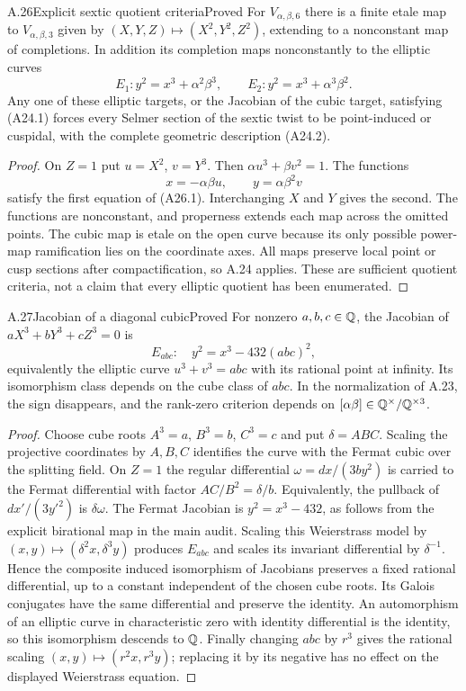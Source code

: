 \begin{statement}{A.26}{Explicit sextic quotient criteria}{Proved}
For $V_{\alpha,\beta,6}$ there is a finite etale map to $V_{\alpha,\beta,3}$ given by $(X,Y,Z)\mapsto(X^2,Y^2,Z^2)$, extending to a nonconstant map of completions. In addition its completion maps nonconstantly to the elliptic curves
\[
E_1:y^2=x^3+\alpha^2\beta^3,
\qquad E_2:y^2=x^3+\alpha^3\beta^2.
\tag{A26.1}
\]
Any one of these elliptic targets, or the Jacobian of the cubic target, satisfying (A24.1) forces every Selmer section of the sextic twist to be point-induced or cuspidal, with the complete geometric description (A24.2).
\end{statement}
\begin{proof}
On $Z=1$ put $u=X^2$, $v=Y^3$. Then $\alpha u^3+\beta v^2=1$. The functions
\[
x=-\alpha\beta u,\qquad y=\alpha\beta^2v
\]
satisfy the first equation of (A26.1). Interchanging $X$ and $Y$ gives the second. The functions are nonconstant, and properness extends each map across the omitted points. The cubic map is etale on the open curve because its only possible power-map ramification lies on the coordinate axes. All maps preserve local point or cusp sections after compactification, so A.24 applies. These are sufficient quotient criteria, not a claim that every elliptic quotient has been enumerated.
\end{proof}

\begin{statement}{A.27}{Jacobian of a diagonal cubic}{Proved}
For nonzero $a,b,c\in\mathbb Q$, the Jacobian of $aX^3+bY^3+cZ^3=0$ is
\[
E_{abc}:\quad y^2=x^3-432(abc)^2,
\]
equivalently the elliptic curve $u^3+v^3=abc$ with its rational point at infinity. Its isomorphism class depends on the cube class of $abc$. In the normalization of A.23, the sign disappears, and the rank-zero criterion depends on $[\alpha\beta]\in\mathbb Q^\times/\mathbb Q^{\times3}$.
\end{statement}
\begin{proof}
Choose cube roots $A^3=a$, $B^3=b$, $C^3=c$ and put $\delta=ABC$. Scaling the projective coordinates by $A,B,C$ identifies the curve with the Fermat cubic over the splitting field. On $Z=1$ the regular differential $\omega=dx/(3by^2)$ is carried to the Fermat differential with factor $AC/B^2=\delta/b$. Equivalently, the pullback of $dx'/(3y'^2)$ is $\delta\omega$. The Fermat Jacobian is $y^2=x^3-432$, as follows from the explicit birational map in the main audit. Scaling this Weierstrass model by $(x,y)\mapsto(\delta^2x,\delta^3y)$ produces $E_{abc}$ and scales its invariant differential by $\delta^{-1}$. Hence the composite induced isomorphism of Jacobians preserves a fixed rational differential, up to a constant independent of the chosen cube roots. Its Galois conjugates have the same differential and preserve the identity. An automorphism of an elliptic curve in characteristic zero with identity differential is the identity, so this isomorphism descends to $\mathbb Q$. Finally changing $abc$ by $r^3$ gives the rational scaling $(x,y)\mapsto(r^2x,r^3y)$; replacing it by its negative has no effect on the displayed Weierstrass equation.
\end{proof}

